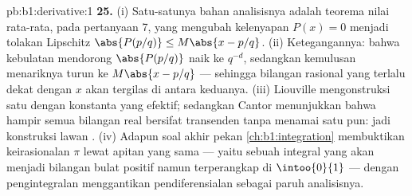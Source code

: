 \begin{solution}{pb:b1:derivative:1}
\textbf{25.} (i) Satu-satunya bahan analisisnya adalah teorema nilai
rata-rata, pada pertanyaan 7, yang mengubah kelenyapan $P(x) =
0$ menjadi tolakan Lipschitz $\abs{P(p/q)} \leq M\abs{x -
p/q}$. (ii) Ketegangannya: bahwa kebulatan mendorong $\abs{P(p/q)}$ naik ke
$q^{-d}$, sedangkan kemulusan menariknya turun ke $M\abs{x - p/q}$ --- sehingga
bilangan rasional yang terlalu dekat dengan $x$ akan tergilas di antara keduanya.
(iii) Liouville mengonstruksi satu  dengan konstanta yang
efektif; sedangkan Cantor menunjukkan bahwa hampir semua bilangan real bersifat transenden
tanpa menamai satu pun: jadi konstruksi lawan . (iv) Adapun
soal akhir pekan \cref{ch:b1:integration} membuktikan
keirasionalan $\pi$ lewat apitan yang sama --- yaitu sebuah integral yang
akan menjadi bilangan bulat positif namun terperangkap di $\intoo{0}{1}$ ---
dengan pengintegralan menggantikan pendiferensialan sebagai paruh
analisisnya.

\end{solution}
